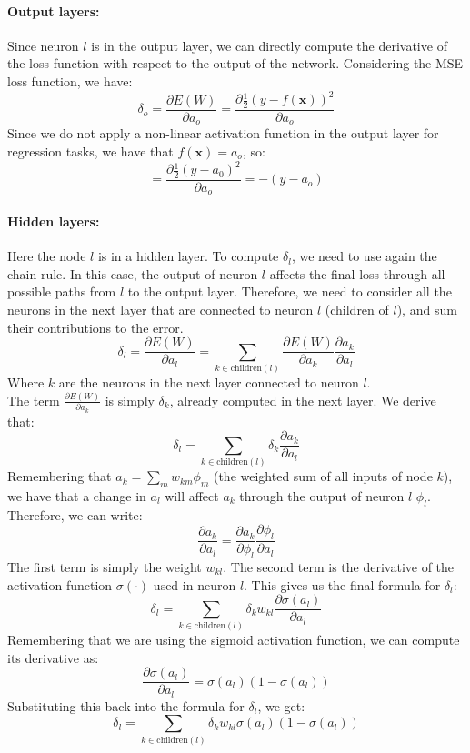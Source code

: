 \paragraph{Output layers:}
Since neuron $l$ is in the output layer, we can directly compute the derivative 
of the loss function with respect to the output of the network. Considering the MSE loss function, we have:
\[\delta_{o} = \frac{\partial E(W)}{\partial a_{o}} = \frac{\partial \frac{1}{2} (y - f(\boldsymbol{x}))^2}{\partial a_{o}} \]
Since we do not apply a non-linear activation function in the output layer for regression tasks, we have that $f(\boldsymbol{x}) = a_{o}$, so:
\[ = \frac{\partial \frac{1}{2} (y - a_0)^2}{\partial a_{o}} = -(y - a_{o}) \]

\paragraph{Hidden layers:}
Here the node $l$ is in a hidden layer. To compute $\delta_l$, we need to use again the chain rule.
In this case, the output of neuron $l$ affects the final loss through all possible paths from $l$ to the output layer. 
Therefore, we need to consider all the neurons in the next layer that are connected to neuron $l$ (children of $l$), and sum their contributions to the error.
\[\delta_{l} = \frac{\partial E(W)}{\partial a_{l}} = \sum_{k \in \text{children}(l)} \frac{\partial E(W)}{\partial a_{k}} \frac{\partial a_{k}}{\partial a_{l}} \]
Where $k$ are the neurons in the next layer connected to neuron $l$. 
\\The term $\frac{\partial E(W)}{\partial a_{k}}$ is simply $\delta_k$, already computed in the next layer. We derive that:
\[\delta_{l} = \sum_{k \in \text{children}(l)} \delta_k \frac{\partial a_{k}}{\partial a_{l}} \]
Remembering that $a_k = \sum_{m} w_{km} \phi_m$ (the weighted sum of all inputs of node $k$), we have that a change in $a_l$ 
will affect $a_k$ through the output of neuron $l$ $\phi_l$. Therefore, we can write:
\[\frac{\partial a_{k}}{\partial a_{l}} = \frac{\partial a_{k}}{\partial \phi_{l}} \frac{\partial \phi_{l}}{\partial a_{l}}\]
The first term is simply the weight $w_{kl}$. The second term is the derivative of the activation function $\sigma(\cdot)$ used in neuron $l$.
This gives us the final formula for $\delta_l$:
\[ \delta_{l} = \sum_{k \in \text{children}(l)} \delta_k w_{kl} \frac{\partial \sigma(a_{l})}{\partial a_{l}} \]
Remembering that we are using the sigmoid activation function, we can compute its derivative as:
\[ \frac{\partial \sigma(a_{l})}{\partial a_{l}} = \sigma(a_{l})(1 - \sigma(a_{l})) \]
Substituting this back into the formula for $\delta_l$, we get:
\[\delta_{l} = \sum_{k \in \text{children}(l)} \delta_k w_{kl} \sigma(a_{l})(1 - \sigma(a_{l})) \]
